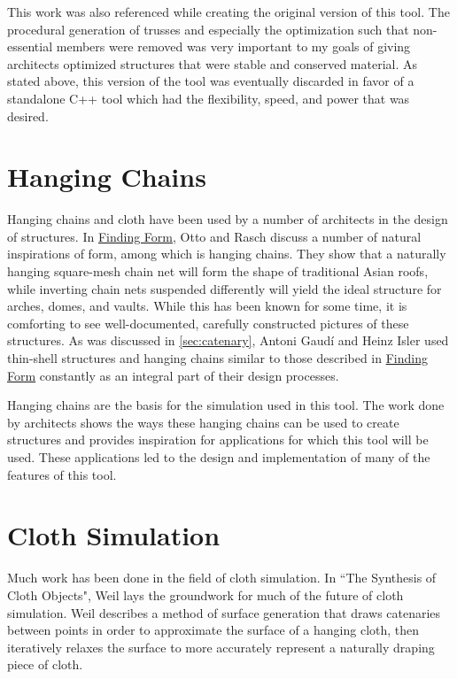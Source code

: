 \documentclass{thesis}
\begin{document}
This work was also referenced while creating the original version of this tool.  The procedural generation
of trusses and especially the optimization such that non-essential members were removed was very important
to my goals of giving architects optimized structures that were stable and conserved material.  As stated
above, this version of the tool was eventually discarded in favor of a standalone C++ tool which had the
flexibility, speed, and power that was desired.

\section{Hanging Chains}
Hanging chains and cloth have been used by a number of architects in the design of structures.  In
\underline{Finding Form}\cite{otto95findingform}, Otto and Rasch discuss a number of natural inspirations of form, among which
is hanging chains.  They show that a naturally hanging square-mesh chain net will form the shape of
traditional Asian roofs, while inverting chain nets suspended differently will yield the ideal structure
for arches, domes, and vaults.  While this has been known for some time, it is comforting to see
well-documented, carefully constructed pictures of these structures.  As was discussed in \ref{sec:catenary},
Antoni Gaud\'{i} and Heinz Isler used thin-shell structures and hanging chains similar to those described in
\underline{Finding Form} constantly as an integral part of their design processes. \nocite{charleson05structasarch}

Hanging chains are the basis for the simulation used in this tool.  The work done by architects shows the ways these
hanging chains can be used to create structures and provides inspiration for applications for which this tool will be
used.  These applications led to the design and implementation of many of the features of this tool.

\section{Cloth Simulation}
Much work has been done in the field of cloth simulation.  In ``The Synthesis of Cloth
Objects"\cite{weil86synthcloth}, Weil lays the groundwork for much of the future of cloth simulation.
Weil describes a method of surface generation that draws catenaries between points in order to approximate
the surface of a hanging cloth, then iteratively relaxes the surface to more accurately represent a
naturally draping piece of cloth.
\end{document}
